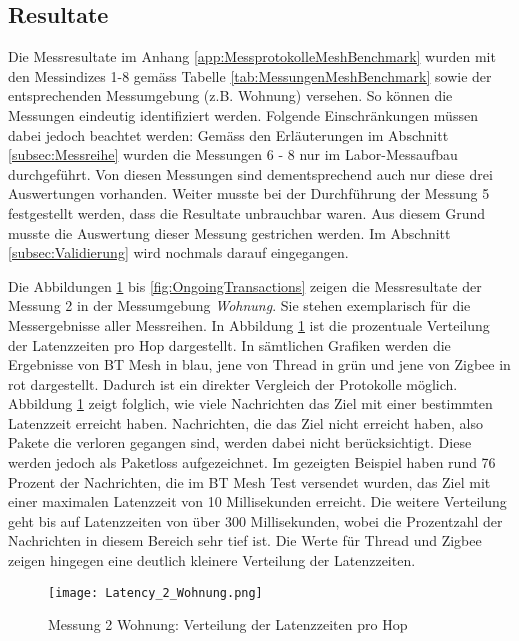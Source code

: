 \subsection{Resultate}\label{subsec:Resultate}
Die Messresultate im Anhang \ref{app:MessprotokolleMeshBenchmark} wurden mit den Messindizes 1-8 gemäss Tabelle \ref{tab:MessungenMeshBenchmark} sowie der entsprechenden Messumgebung (z.B. Wohnung) versehen.
So können die Messungen eindeutig identifiziert werden.
Folgende Einschränkungen müssen dabei jedoch beachtet werden:
Gemäss den Erläuterungen im Abschnitt \ref{subsec:Messreihe} wurden die Messungen 6 - 8 nur im Labor-Messaufbau durchgeführt. Von diesen Messungen sind dementsprechend auch nur diese drei Auswertungen vorhanden.
Weiter musste bei der Durchführung der Messung 5 festgestellt werden, dass die Resultate unbrauchbar waren.
Aus diesem Grund musste die Auswertung dieser Messung gestrichen werden.
Im Abschnitt \ref{subsec:Validierung} wird nochmals darauf eingegangen.

Die Abbildungen \ref{fig:VerteilungderLatenzzeiten} bis \ref{fig:OngoingTransactions} zeigen die Messresultate der Messung 2 in der Messumgebung \textit{Wohnung}. Sie stehen exemplarisch für die Messergebnisse aller Messreihen.
In Abbildung \ref{fig:VerteilungderLatenzzeiten} ist die prozentuale Verteilung der Latenzzeiten pro Hop dargestellt.
In sämtlichen Grafiken werden die Ergebnisse von BT Mesh in blau, jene von Thread in grün und jene von Zigbee in rot dargestellt.
Dadurch ist ein direkter Vergleich der Protokolle möglich.
Abbildung \ref{fig:VerteilungderLatenzzeiten} zeigt folglich, wie viele Nachrichten das Ziel mit einer bestimmten Latenzzeit erreicht haben.
Nachrichten, die das Ziel nicht erreicht haben, also Pakete die verloren gegangen sind, werden dabei nicht berücksichtigt. Diese werden jedoch als Paketloss aufgezeichnet. Im gezeigten Beispiel haben rund 76 Prozent der Nachrichten, die im BT Mesh Test versendet wurden, das Ziel mit einer maximalen Latenzzeit von 10 Millisekunden erreicht.
Die weitere Verteilung geht bis auf Latenzzeiten von über 300 Millisekunden, wobei die Prozentzahl der Nachrichten in diesem Bereich sehr tief ist.
Die Werte für Thread und Zigbee zeigen hingegen eine deutlich kleinere Verteilung der Latenzzeiten.

\begin{figure}[h]
	\centering
	\texttt{[image: Latency\_2\_Wohnung.png]}
	\caption{Messung 2 Wohnung: Verteilung der Latenzzeiten pro Hop}
	\label{fig:VerteilungderLatenzzeiten}
\end{figure}


